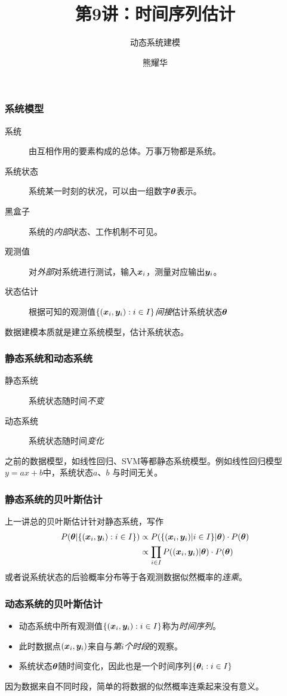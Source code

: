 \documentclass[14pt]{beamer}
\title{第9讲：时间序列估计}
\subtitle{动态系统建模}
\author{熊耀华}
\institute{交通工程系}
\begin{document}
\begin{frame}
    \titlepage
\end{frame}

\begin{frame}
  \frametitle{系统模型}
  \begin{description}
    \item[系统] 由互相作用的要素构成的总体。万事万物都是系统。
    \item[系统状态] 系统某一时刻的状况，可以由一组数字$\bm{\theta}$表示。
    \item[黑盒子] 系统的\emph{内部}状态、工作机制不可见。
    \item[观测值] 对\emph{外部}对系统进行测试，输入$\bm{x}_i$，测量对应输出$\bm{y}_i$。
    \item[状态估计] 根据可知的观测值$\{(\bm{x}_i,\bm{y}_i):i\in I\}$\emph{间接}估计系统状态$\bm{\theta}$
  \end{description}
  
  数据建模本质就是建立系统模型，估计系统状态。
\end{frame}

\begin{frame}
  \frametitle{静态系统和动态系统}

  \begin{description}
    \item[静态系统] 系统状态随时间\emph{不变}
    \item[动态系统] 系统状态随时间\emph{变化}
  \end{description}

  之前的数据模型，如线性回归、SVM等都静态系统模型。例如线性回归模型$y=ax+b$中，系统状态$a$、$b$
  与时间无关。
\end{frame}

\begin{frame}
  \frametitle{静态系统的贝叶斯估计}
  上一讲总的贝叶斯估计针对静态系统，写作
  \begin{equation}
    \begin{split}
      P(\bm{\theta}|\{(\bm{x}_i,\bm{y}_i):i\in I\})&\propto P(\{(\bm{x}_i,\bm{y}_i)|i\in I\}|\bm{\theta})\cdot P(\bm{\theta})\\
      &\propto \prod_{i\in I} P((\bm{x}_i,\bm{y}_i)|\bm{\theta})\cdot P(\bm{\theta})
    \end{split}
  \end{equation}
  或者说系统状态的后验概率分布等于各观测数据似然概率的\emph{连乘}。
\end{frame}

\begin{frame}
  \frametitle{动态系统的贝叶斯估计}
  \begin{itemize}
    \item 动态系统中所有观测值$\{(\bm{x}_i,\bm{y}_i):i\in I\}$称为\emph{时间序列}。
    \item 此时数据点$(\bm{x}_i,\bm{y}_i)$来自与\emph{第$i$个时段}的观察。
    \item 系统状态$\bm{\theta}$随时间变化，因此也是一个时间序列$\{\bm{\theta}_i:i\in I\}$
  \end{itemize}

  因为数据来自不同时段，简单的将数据的似然概率连乘起来没有意义。
\end{frame}
\end{document}
